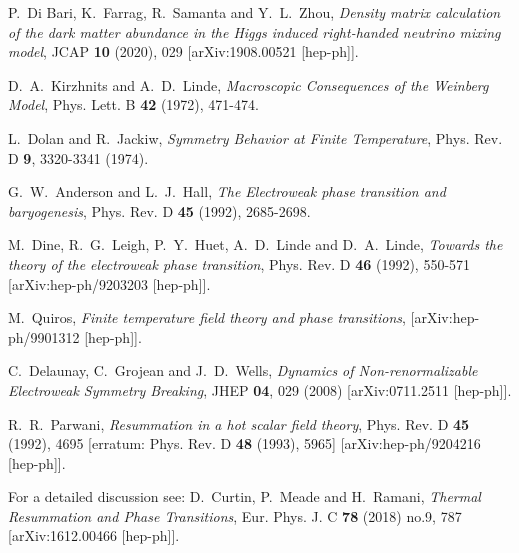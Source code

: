 \documentclass[a4paper,11pt]{article}
\begin{document}
\begin{thebibliography}{99}
P.~Di Bari, K.~Farrag, R.~Samanta and Y.~L.~Zhou,
{\em Density matrix calculation of the dark matter abundance in the Higgs induced right-handed neutrino mixing model},
JCAP \textbf{10} (2020), 029
[arXiv:1908.00521 [hep-ph]].

D.~A.~Kirzhnits and A.~D.~Linde, {\em Macroscopic Consequences of the Weinberg Model},
Phys. Lett. B \textbf{42} (1972), 471-474.

L.~Dolan and R.~Jackiw, {\em Symmetry Behavior at Finite Temperature},
Phys. Rev. D \textbf{9}, 3320-3341 (1974).

G.~W.~Anderson and L.~J.~Hall,
{\em The Electroweak phase transition and baryogenesis},
Phys. Rev. D \textbf{45} (1992), 2685-2698.

M.~Dine, R.~G.~Leigh, P.~Y.~Huet, A.~D.~Linde and D.~A.~Linde,
{\em Towards the theory of the electroweak phase transition},
Phys. Rev. D \textbf{46} (1992), 550-571
[arXiv:hep-ph/9203203 [hep-ph]].

M.~Quiros,
{\em Finite temperature field theory and phase transitions},
[arXiv:hep-ph/9901312 [hep-ph]].



C.~Delaunay, C.~Grojean and J.~D.~Wells,
{\em Dynamics of Non-renormalizable Electroweak Symmetry Breaking},
JHEP \textbf{04}, 029 (2008)
[arXiv:0711.2511 [hep-ph]].

R.~R.~Parwani,
{\em Resummation in a hot scalar field theory},
Phys. Rev. D \textbf{45} (1992), 4695
[erratum: Phys. Rev. D \textbf{48} (1993), 5965]
[arXiv:hep-ph/9204216 [hep-ph]].

For a detailed discussion see: D.~Curtin, P.~Meade and H.~Ramani,
{\em Thermal Resummation and Phase Transitions},
Eur. Phys. J. C \textbf{78} (2018) no.9, 787
[arXiv:1612.00466 [hep-ph]].


\end{thebibliography}
\end{document}
